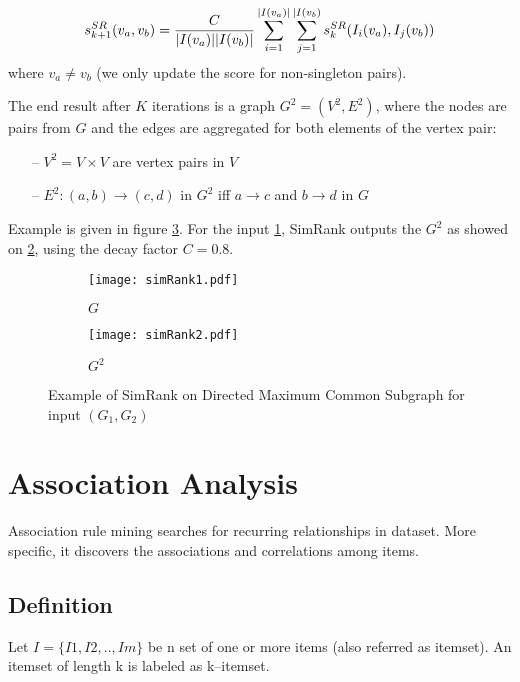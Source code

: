 \begin{equation}
	s_{k+1}^{SR}(v_{a},v_{b})= \dfrac{C}{\arrowvert I(v_{a})\arrowvert \arrowvert I(v_{b})\arrowvert}
	\sum_{i=1}^{\arrowvert I(v_{a})\arrowvert}\sum_{j=1}^{\arrowvert I(v_{b})}s_{k}^{SR}(I_{i}(v_{a}), I_{j}(v_{b}))
\end{equation}
where $v_{a}\neq v_{b}$ (we only update the score for non-singleton pairs).

The end result after $K$ iterations is a graph $G^{2} = (V^{2},E^{2})$, where the nodes are pairs from $G$
and the edges are aggregated for both elements of the vertex pair:
\begin{itemize}
	\item[--] $V^{2} = V\times V$ are vertex pairs in $V$
	\item[--] $E^{2}:(a,b) \rightarrow (c,d)$ in $G^{2}$ iff $a\rightarrow c$ and $b\rightarrow d$ in $G$
\end{itemize}
Example is given in figure \ref{fig:simrank}. For the input \ref{fig:simrank1}, SimRank outputs the $G^{2}$ as showed on \ref{fig:simrank2}, using the decay factor $C=0.8$.

\begin{figure}[t]
	\begin{subfigure}{.35\textwidth}
		\centering
		\texttt{[image: simRank1.pdf]}
		\caption{$G$}
		\label{fig:simrank1}
	\end{subfigure}%
	\begin{subfigure}{.65\textwidth}
		\centering
		\texttt{[image: simRank2.pdf]}
		\caption{$G^{2}$}
		\label{fig:simrank2}
	\end{subfigure}
	\caption{Example of SimRank on Directed Maximum Common Subgraph for input $(G_{1},G_{2})$ }
	\label{fig:simrank}
\end{figure}

\section{Association Analysis}
Association rule mining searches for recurring relationships in dataset.
More specific, it discovers the associations and correlations among items\cite{Han:2005:DMC:1076797}.
\subsection{Definition}
Let $I=\{I1,I2,..,Im\}$ be n set of one or more items (also referred as itemset).
An itemset of length k is labeled as k--itemset.

